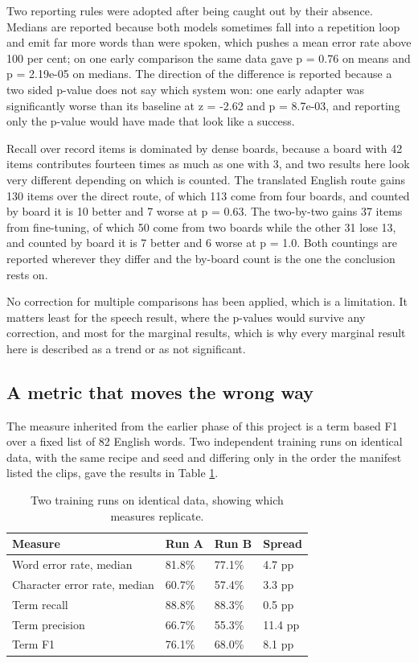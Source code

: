 Two reporting rules were adopted after being caught out by their absence. Medians are
reported because both models sometimes fall into a repetition loop and emit far more words
than were spoken, which pushes a mean error rate above 100 per cent; on one early
comparison the same data gave p = 0.76 on means and p = 2.19e-05 on medians. The direction
of the difference is reported because a two sided p-value does not say which system won:
one early adapter was significantly worse than its baseline at z = -2.62 and p = 8.7e-03,
and reporting only the p-value would have made that look like a success.

Recall over record items is dominated by dense boards, because a board with 42 items
contributes fourteen times as much as one with 3, and two results here look very different
depending on which is counted. The translated English route gains 130 items over the
direct route, of which 113 come from four boards, and counted by board it is 10 better and
7 worse at p = 0.63. The two-by-two gains 37 items from fine-tuning, of which 50 come from
two boards while the other 31 lose 13, and counted by board it is 7 better and 6 worse at
p = 1.0. Both countings are reported wherever they differ and the by-board count is the
one the conclusion rests on.

No correction for multiple comparisons has been applied, which is a limitation. It matters least for the speech result, where the p-values would survive any
correction, and most for the marginal results, which is why every marginal result here is
described as a trend or as not significant.

\subsection{A metric that moves the wrong way}

The measure inherited from the earlier phase of this project is a term based F1 over a
fixed list of 82 English words. Two independent training runs on identical data, with the
same recipe and seed and differing only in the order the manifest listed the clips, gave
the results in Table \ref{tab:termf1}.

\begin{table}[htbp]
\centering
\caption{Two training runs on identical data, showing which measures replicate.}
\label{tab:termf1}
\small
\begin{tabular}{p{4.6cm}p{3.0cm}p{3.0cm}p{2.4cm}}
\toprule
Measure & Run A & Run B & Spread \\
\midrule
Word error rate, median & 81.8\% & 77.1\% & 4.7 pp \\
Character error rate, median & 60.7\% & 57.4\% & 3.3 pp \\
Term recall & 88.8\% & 88.3\% & 0.5 pp \\
Term precision & 66.7\% & 55.3\% & 11.4 pp \\
Term F1 & 76.1\% & 68.0\% & 8.1 pp \\
\bottomrule
\end{tabular}
\end{table}

